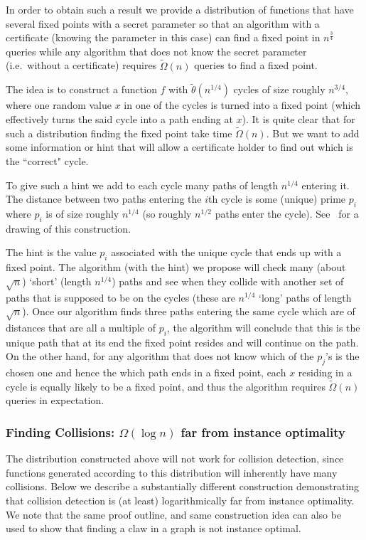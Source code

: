 \documentclass[11pt]{article}
\numberwithin{equation}{section}
\newcommand{\1}{\mathbf{1}}
\begin{document}
In order to obtain such a result 
we provide a distribution of functions that have several fixed 
points  with a secret parameter so that an algorithm with a certificate (knowing the  parameter in this case) can find a fixed point in $n^{\frac{3}{4}}$ queries while any algorithm that does not know the secret parameter (i.e.\ without  a certificate) requires $\tilde\Omega(n)$ queries to find a fixed point.  

The idea is to construct a function $f$ with $\tilde{\theta}(n^{1/4})$ cycles of size roughly $n^{3/4}$, where one random value $x$ in one of the cycles is turned into a fixed point (which effectively turns the said cycle into a path ending at $x$). It is quite clear that for such a distribution finding the fixed point take time $\tilde\Omega(n)$. But we want to add some information or hint that will allow a certificate holder to find out which is the ``correct" cycle.

To give such a hint we add to each cycle  many paths of length $n^{1/4}$ entering it. The distance between two paths entering the $i$th cycle is some (unique)  prime $p_i$ where $p_i$ is of size roughly $n^{1/4}$ (so roughly $n^{1/2}$ paths enter the cycle). See~ for a drawing of this construction.

The hint is the value $p_i$ associated with the unique cycle that ends up with a fixed point. The algorithm (with the hint) we propose will check many (about $\sqrt n$) `short' (length $n^{1/4}$) paths and see when they collide with another set of paths that is supposed to be on the cycles (these are $n^{1/4}$ `long' paths of  length $\sqrt n$).  Once our algorithm finds three paths entering the same cycle which are of distances that are all a multiple of $p_i$, the algorithm will conclude that this is the unique path that at its end the fixed point resides and will continue on the path. On the other hand,  for any algorithm that does not know which of the $p_j$'s is the chosen one and hence the  which path ends in a fixed point, each $x$ residing in a cycle is equally likely to be a fixed point, and thus the algorithm requires $\tilde{\Omega}(n)$ queries in expectation. 



\subsubsection{Finding Collisions:  $\Omega(\log n)$ far from instance optimality}

The distribution constructed above will not work for collision detection, since functions generated according to this distribution will inherently have many collisions. Below we describe a substantially different construction demonstrating that collision detection is (at least) logarithmically far from instance optimality.
We note that the same proof outline, and same construction idea can also be used to show that finding a claw in a graph is not instance optimal.
\end{document}
